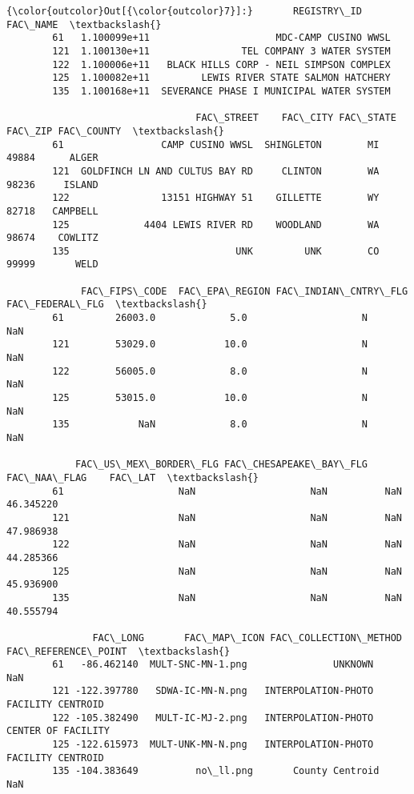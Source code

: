 \documentclass[11pt]{article}
\begin{document}
\begin{Verbatim}[commandchars=\\\{\}]
{\color{outcolor}Out[{\color{outcolor}7}]:}       REGISTRY\_ID                                  FAC\_NAME  \textbackslash{}
        61   1.100099e+11                      MDC-CAMP CUSINO WWSL   
        121  1.100130e+11                TEL COMPANY 3 WATER SYSTEM   
        122  1.100006e+11   BLACK HILLS CORP - NEIL SIMPSON COMPLEX   
        125  1.100082e+11         LEWIS RIVER STATE SALMON HATCHERY   
        135  1.100168e+11  SEVERANCE PHASE I MUNICIPAL WATER SYSTEM   
        
                                 FAC\_STREET    FAC\_CITY FAC\_STATE FAC\_ZIP FAC\_COUNTY  \textbackslash{}
        61                 CAMP CUSINO WWSL  SHINGLETON        MI   49884      ALGER   
        121  GOLDFINCH LN AND CULTUS BAY RD     CLINTON        WA   98236     ISLAND   
        122                13151 HIGHWAY 51    GILLETTE        WY   82718   CAMPBELL   
        125             4404 LEWIS RIVER RD    WOODLAND        WA   98674    COWLITZ   
        135                             UNK         UNK        CO   99999       WELD   
        
             FAC\_FIPS\_CODE  FAC\_EPA\_REGION FAC\_INDIAN\_CNTRY\_FLG FAC\_FEDERAL\_FLG  \textbackslash{}
        61         26003.0             5.0                    N             NaN   
        121        53029.0            10.0                    N             NaN   
        122        56005.0             8.0                    N             NaN   
        125        53015.0            10.0                    N             NaN   
        135            NaN             8.0                    N             NaN   
        
            FAC\_US\_MEX\_BORDER\_FLG FAC\_CHESAPEAKE\_BAY\_FLG FAC\_NAA\_FLAG    FAC\_LAT  \textbackslash{}
        61                    NaN                    NaN          NaN  46.345220   
        121                   NaN                    NaN          NaN  47.986938   
        122                   NaN                    NaN          NaN  44.285366   
        125                   NaN                    NaN          NaN  45.936900   
        135                   NaN                    NaN          NaN  40.555794   
        
               FAC\_LONG       FAC\_MAP\_ICON FAC\_COLLECTION\_METHOD FAC\_REFERENCE\_POINT  \textbackslash{}
        61   -86.462140  MULT-SNC-MN-1.png               UNKNOWN                 NaN   
        121 -122.397780   SDWA-IC-MN-N.png   INTERPOLATION-PHOTO   FACILITY CENTROID   
        122 -105.382490   MULT-IC-MJ-2.png   INTERPOLATION-PHOTO  CENTER OF FACILITY   
        125 -122.615973  MULT-UNK-MN-N.png   INTERPOLATION-PHOTO   FACILITY CENTROID   
        135 -104.383649          no\_ll.png       County Centroid                 NaN   
        

\end{Verbatim}
\end{document}
